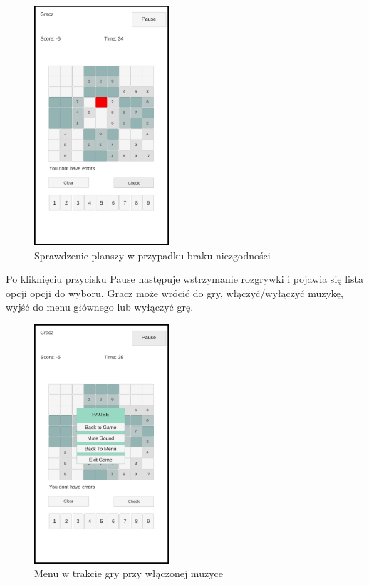 \documentclass[a4paper, 11pt]{article}
\begin{document}
\begin{figure}[H]
	\centering
	\includegraphics[width=5cm]{zrzuty/9.png}
	\caption{Sprawdzenie planszy w przypadku braku niezgodności}
	\label{fig:check_ok}
\end{figure}
Po kliknięciu przycisku Pause następuje wstrzymanie rozgrywki i pojawia się lista opcji opcji do wyboru. Gracz może wrócić do gry, włączyć/wyłączyć muzykę, wyjść do menu głównego lub wyłączyć grę.
\begin{figure}[H]
	\centering
	\includegraphics[width=5cm]{zrzuty/10.png}
	\caption{Menu w trakcie gry przy włączonej muzyce}
	\label{fig:menu_pause}
\end{figure}
\end{document}
